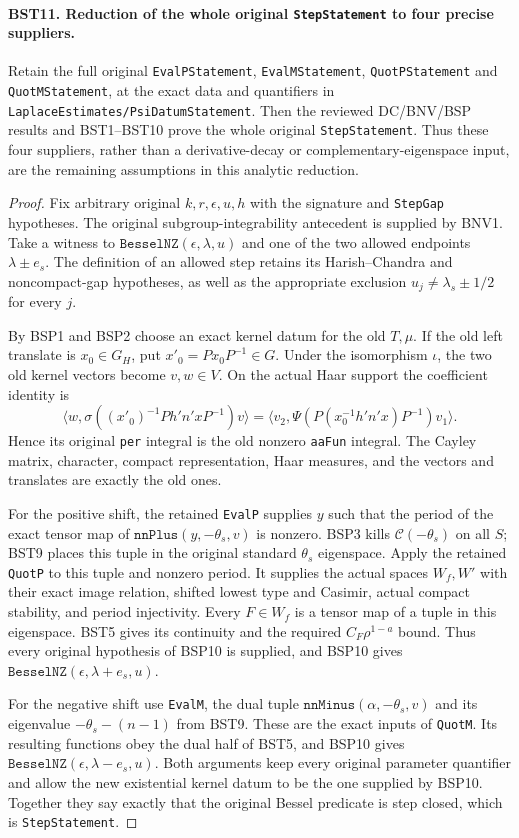 \paragraph{BST11. Reduction of the whole original \texttt{StepStatement} to four precise suppliers.}
\label{claim:BST11}
Retain the full original \texttt{EvalPStatement},
\texttt{EvalMStatement}, \texttt{QuotPStatement} and
\texttt{QuotMStatement}, at the exact data and quantifiers in
\texttt{LaplaceEstimates/PsiDatumStatement}.  Then the reviewed
DC/BNV/BSP results and BST1--BST10 prove the whole original
\texttt{StepStatement}.
Thus these four suppliers, rather than a derivative-decay or
complementary-eigenspace input, are the remaining assumptions in
this analytic reduction.

\begin{proof}
Fix arbitrary original $k,r,\epsilon,u,h$ with the signature and
\texttt{StepGap} hypotheses.  The original subgroup-integrability
antecedent is supplied by BNV1.
Take a witness to $\texttt{BesselNZ}(\epsilon,\lambda,u)$ and
one of the two allowed endpoints $\lambda\pm e_s$.
The definition of an allowed step retains its Harish--Chandra and
noncompact-gap hypotheses, as well as the appropriate exclusion
$u_j\ne\lambda_s\pm1/2$ for every $j$.

By BSP1 and BSP2 choose an exact kernel datum for the old
$T,\mu$.  If the old left translate is $x_0\in G_H$, put
$x'_0=Px_0P^{-1}\in G$.  Under the isomorphism $\iota$,
the two old kernel vectors become $v,w\in V$.
On the actual Haar support the coefficient identity is
\[
 \langle w,\sigma((x'_0)^{-1}P h'n'xP^{-1})v\rangle
 =
 \langle v_2,\Psi(P(x_0^{-1}h'n'x)P^{-1})v_1\rangle.
 \tag{BST.36}
\]
Hence its original \texttt{per} integral is the old nonzero
\texttt{aaFun} integral.  The Cayley matrix, character, compact
representation, Haar measures, and the vectors and translates
are exactly the old ones.

For the positive shift, the retained \texttt{EvalP} supplies $y$
such that the period of the exact tensor map of
$\texttt{nnPlus}(y,-\theta_s,v)$ is nonzero.
BSP3 kills $\mathcal C(-\theta_s)$ on all $S$; BST9 places this
tuple in the original standard $\theta_s$ eigenspace.
Apply the retained \texttt{QuotP} to this tuple and nonzero period.
It supplies the actual spaces $W_f,W'$ with their exact image
relation, shifted lowest type and Casimir, actual compact stability,
and period injectivity.
Every $F\in W_f$ is a tensor map of a tuple in this eigenspace.
BST5 gives its continuity and the required
$C_F\rho^{1-a}$ bound.  Thus every original hypothesis of
BSP10 is supplied, and BSP10 gives
$\texttt{BesselNZ}(\epsilon,\lambda+e_s,u)$.

For the negative shift use \texttt{EvalM}, the dual tuple
$\texttt{nnMinus}(\alpha,-\theta_s,v)$ and its eigenvalue
$-\theta_s-(n-1)$ from BST9.  These are the exact inputs of
\texttt{QuotM}.  Its resulting functions obey the dual half of
BST5, and BSP10 gives
$\texttt{BesselNZ}(\epsilon,\lambda-e_s,u)$.
Both arguments keep every original parameter quantifier and allow
the new existential kernel datum to be the one supplied by BSP10.
Together they say exactly that the original Bessel predicate is
step closed, which is \texttt{StepStatement}.
\end{proof}
